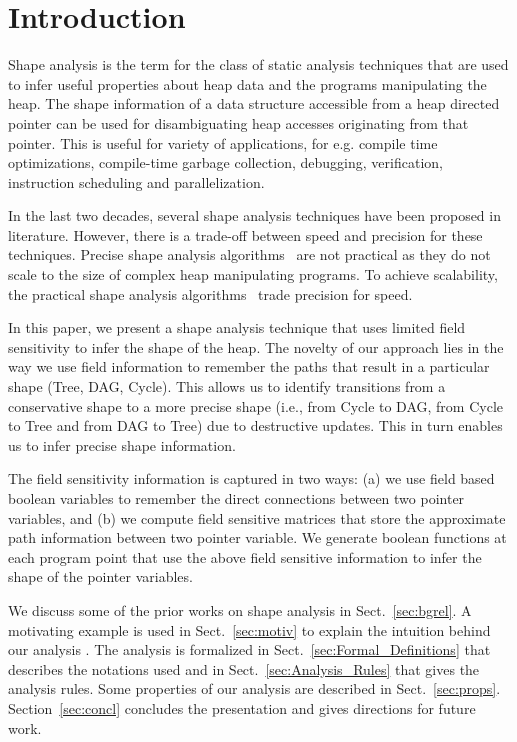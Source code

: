 \documentclass{sig-alternate}
\begin{document}
\section{Introduction}
Shape analysis is the term for the class of static analysis
techniques that are used to infer useful properties about
heap data and the programs manipulating the heap. The shape
information of a data structure accessible from a heap
directed pointer can be used for disambiguating heap accesses
originating from that pointer. This is useful for variety of
applications, for e.g. compile time optimizations,
compile-time garbage collection, debugging, verification,
instruction scheduling and parallelization.

In the last two decades, several shape analysis techniques have
been proposed in literature. However, there is a trade-off
between speed and precision for these techniques. Precise
shape analysis
algorithms~\cite{Sagiv96,shaham03heap,distefano06local,hackett05region} 
are not practical as they do not scale to the size of complex
heap manipulating programs. To achieve scalability,
the practical shape analysis
algorithms~\cite{Chase90,Ghiya96,marron06static} trade
precision for speed.

In this paper, we present a shape analysis technique that
uses limited field sensitivity to infer the shape of the
heap. The novelty of our approach lies in the way we use
field information to remember the paths that result in a
particular shape (Tree, DAG, Cycle).  This allows us to
identify transitions from a conservative shape to a more precise
shape (i.e., from Cycle to DAG, from Cycle to Tree and from
DAG to Tree) due to destructive updates. This in turn enables
us to infer precise shape information.


The field sensitivity information is captured in two ways:
(a) we use field based boolean variables to remember the
direct connections between two pointer variables, and (b) we
compute field sensitive matrices that store the approximate
path information between two pointer variable. We generate
boolean functions at each program point that use the above
field sensitive information to infer the shape of the pointer
variables.

We discuss some of the prior works on shape analysis in
Sect.~\ref{sec:bgrel}. A motivating example is used in
Sect.~\ref{sec:motiv} to explain the intuition behind our
analysis .  The analysis is formalized in
Sect.~\ref{sec:Formal_Definitions} that describes the
notations used and in Sect.~\ref{sec:Analysis_Rules} that
gives the analysis rules. Some properties of our analysis
are described in
Sect.~\ref{sec:props}. Section~\ref{sec:concl} concludes the
presentation and gives directions for future work.
\end{document}
